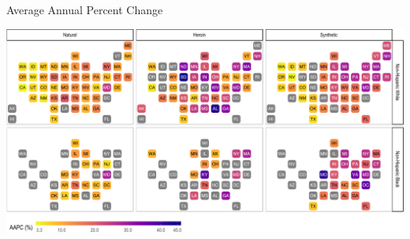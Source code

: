 \documentclass[ignorenonframetext,compress]{beamer}
\begin{document}
\begin{frame}{Average Annual Percent Change}

\includegraphics{epc_slides_files/figure-beamer/unnamed-chunk-12-1.pdf}

\end{frame}
\end{document}
